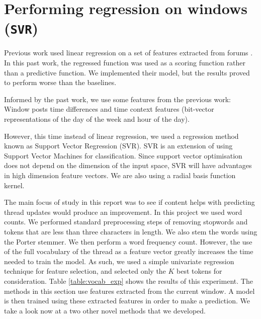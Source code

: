 \section{Performing regression on windows (\texttt{SVR})}
Previous work used linear regression on a set of features extracted from forums 
\cite{Yang2009}. In this past work, the regressed function 
was used as a scoring function rather than a predictive function. We implemented 
their model, but the results proved to perform worse than the baselines.

Informed by the past work, we use some features from the previous work: Window 
posts time differences and time context features (bit-vector representations of 
the day of the week and hour of the day).

However, this time instead of linear regression, we used a regression method 
known as Support Vector Regression (SVR). SVR is an extension of using Support 
Vector Machines for classification. Since support vector optimisation does not 
depend on the dimension of the input space, SVR will have advantages in high 
dimension feature vectors. We are also using a radial basis function kernel.

The main focus of study in this report was to see if content helps with 
predicting thread updates would produce an improvement. In this project we used 
word counts. We performed standard preprocessing steps of removing stopwords and 
tokens that are less than three characters in length. We also stem the words 
using the Porter stemmer.
We then perform a word frequency count. However, the use 
of the full vocabulary of the thread as a feature vector greatly increases the 
time needed to train the model.
 As such, we used a simple univariate regression 
technique for feature selection, and selected only the $K$ best tokens for 
consideration. Table \ref{table:vocab_exp} shows the results of this experiment.  
The methods in this section use features extracted from the current window. A 
model is then trained using these extracted features in order to make a 
prediction. We take a look now at a two other novel methods that we developed.

